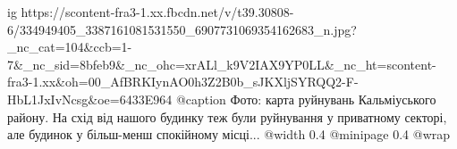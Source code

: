  
 
 
 
 

\ifcmt
  ig https://scontent-fra3-1.xx.fbcdn.net/v/t39.30808-6/334949405_3387161081531550_6907731069354162683_n.jpg?_nc_cat=104&ccb=1-7&_nc_sid=8bfeb9&_nc_ohc=xrALl_k9V2IAX9YP0LL&_nc_ht=scontent-fra3-1.xx&oh=00_AfBRKIynAO0h3Z2B0b_sJKXljSYRQQ2-F-HbL1JxIvNcsg&oe=6433E964
  @caption Фото: карта руйнувань Кальміуського району. На схід від нашого будинку теж були руйнування у приватному секторі, але будинок у більш-менш спокійному місці...
  @width 0.4
  @minipage 0.4
  @wrap \parpic[r]
\fi
